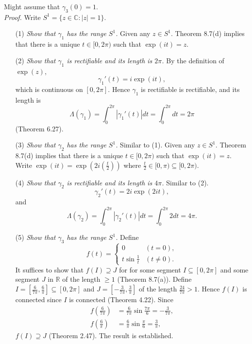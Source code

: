 \documentclass{article}
\begin{document}
Might assume that $\gamma_3(0) = 1$. \\



\emph{Proof.}
Write $S^1 = \{ z \in \mathbb{C} : |z| = 1 \}$.
\begin{enumerate}
  \item[(1)]
  \emph{Show that $\gamma_1$ has the range $S^1$.}
  Given any $z \in S^1$.
  Theorem 8.7(d) implies that there is a unique $t \in [0,2\pi)$
  such that $\exp(it) = z$.

  \item[(2)]
  \emph{Show that $\gamma_1$ is rectifiable and its length is $2\pi$.}
  By the definition of $\exp(z)$,
  \[
    \gamma_1'(t) = i\exp(it),
  \]
  which is continuous on $[0,2\pi]$.
  Hence $\gamma_1$ is rectifiable is rectifiable, and its length is
  \[
    \Lambda(\gamma_1)
    = \int_{0}^{2\pi}|\gamma_1'(t)|dt
    = \int_{0}^{2\pi} dt
    = 2\pi
  \]
  (Theorem 6.27).

  \item[(3)]
  \emph{Show that $\gamma_2$ has the range $S^1$.}
  Similar to (1).
  Given any $z \in S^1$.
  Theorem 8.7(d) implies that there is a unique $t \in [0,2\pi)$
  such that $\exp(it) = z$.
  Write $\exp(it) = \exp(2i\left(\frac{t}{2}\right))$
  where $\frac{t}{2} \in [0,\pi) \subseteq [0,2\pi)$.

  \item[(4)]
  \emph{Show that $\gamma_2$ is rectifiable and its length is $4\pi$.}
  Similar to (2).
  \[
    \gamma_2'(t) = 2i\exp(2it),
  \]
  and
  \[
    \Lambda(\gamma_2)
    = \int_{0}^{2\pi}|\gamma_2'(t)|dt
    = \int_{0}^{2\pi} 2 dt
    = 4\pi.
  \]

  \item[(5)]
  \emph{Show that $\gamma_3$ has the range $S^1$.}
  Define
  \begin{equation*}
  f(t) =
    \begin{cases}
      0
      & (t = 0), \\
      t \sin\frac{1}{t}
      & (t \neq 0).
    \end{cases}
  \end{equation*}
  It suffices to show that $f(I) \supseteq J$
  for for some segment $I \subseteq [0,2\pi]$ and
  some segment $J$ in $\mathbb{R}$ of the length $\geq 1$ (Theorem 8.7(a)).
  Define $I = \left[\frac{6}{7\pi}, \frac{6}{\pi} \right] \subseteq [0,2\pi]$
  and $J = \left[-\frac{3}{7\pi}, \frac{3}{\pi} \right]$ of the length $\frac{24}{7\pi} > 1$.
  Hence $f(I)$ is connected since $I$ is connected (Theorem 4.22).
  Since
  \begin{align*}
    f\left(\frac{6}{7\pi}\right) &= \frac{6}{7\pi} \sin\frac{7\pi}{6} = -\frac{3}{7\pi}, \\
    f\left(\frac{6}{\pi}\right) &= \frac{6}{\pi} \sin\frac{\pi}{6} = \frac{3}{\pi},
  \end{align*}
  $f(I) \supseteq J$ (Theorem 2.47).
  The result is established.


\end{enumerate}
\end{document}
